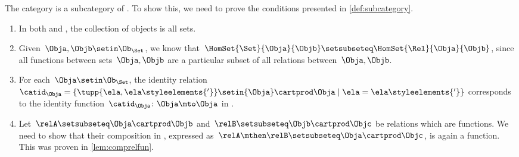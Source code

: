 \begin{example}
    The category \Set is a subcategory of \Rel.
    To show this, we need to prove the conditions presented in \cref{def:subcategory}.
    \begin{enumerate}
        \item In both \Rel and \Set, the collection of objects is all sets.
        \item Given~$\Obja,\Objb\setin \Ob_{\Set}$, we know that~$\HomSet{\Set}{\Obja}{\Objb}\setsubseteq \HomSet{\Rel}{\Obja}{\Objb}$, since all functions between sets~$\Obja,\Objb$ are a particular subset of all relations between~$\Obja,\Objb$.
        \item For each~$\Obja \setin \Ob_{\Set}$, the identity relation~$\catid_\Obja=\{\tupp{\ela,\ela\styleelements{'}}\setin {\Obja} \cartprod \Obja \mid \ela=\ela\styleelements{'}\}$ corresponds to the identity function~$\catid_\Obja \colon \Obja \mto \Obja$ in \Set.
        \item Let~$\relA\setsubseteq \Obja\cartprod \Objb$ and~$\relB\setsubseteq \Objb \cartprod \Objc$ be relations which are functions.
              We need to show that their composition in \Rel, expressed as~$\relA\mthen \relB\setsubseteq \Obja\cartprod \Objc$, is again a function.
              This was proven in \cref{lem:comprelfun}.
    \end{enumerate}
\end{example}
